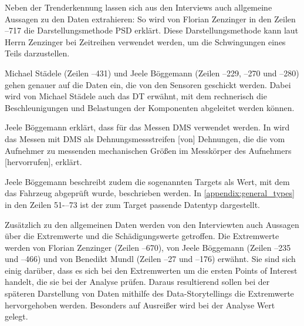 Neben der Trenderkennung lassen sich aus den Interviews auch allgemeine Aussagen zu den Daten extrahieren: So wird von Florian Zenzinger in den Zeilen --717 die Darstellungsmethode \ac{PSD} erklärt. Diese Darstellungsmethode kann laut Herrn Zenzinger bei Zeitreihen verwendet werden, um die Schwingungen eines Teils darzustellen.

Michael Städele (Zeilen --431) und Jeele Böggemann (Zeilen --229, --270 und --280) gehen genauer auf die Daten ein, die von den Sensoren geschickt werden. Dabei wird von Michael Städele auch das \ac{DT} erwähnt, mit dem rechnerisch die Beschleunigungen und Belastungen der Komponenten abgeleitet werden können.

Jeele Böggemann erklärt, dass für das Messen \ac{DMS} verwendet werden. In \cite{Keil.2017} wird das Messen mit \ac{DMS} als  Dehnungsmessstreifen [von] Dehnungen, die die vom Aufnehmer zu messenden mechanischen Größen im Messkörper des Aufnehmers [hervorrufen]\grqq{}, erklärt.

Jeele Böggemann beschreibt zudem die sogenannten Targets als \glqq Wert, mit dem das Fahrzeug abgeprüft wurde\grqq{}, beschrieben werden. In \ref{appendix:general_types} in den Zeilen 51-–73 ist der zum Target passende Datentyp dargestellt.

Zusätzlich zu den allgemeinen Daten werden von den Interviewten auch Aussagen über die Extremwerte und die Schädigungswerte getroffen. Die Extremwerte werden von Florian Zenzinger (Zeilen --670), von Jeele Böggemann (Zeilen --235 und --466) und von Benedikt Mundl (Zeilen --27 und --176) erwähnt. Sie sind sich einig darüber, dass es sich bei den Extremwerten um die ersten Points of Interest handelt, die sie bei der Analyse prüfen. Daraus resultierend sollen bei der späteren Darstellung von Daten mithilfe des Data-Storytellings die Extremwerte hervorgehoben werden. Besonders auf \glqq Ausreißer\grqq{} wird bei der Analyse Wert gelegt.

